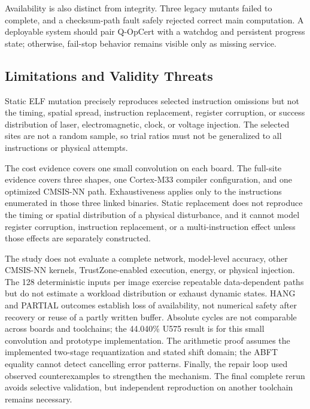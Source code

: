 \documentclass[conference]{IEEEtran}
\begin{document}
Availability is also distinct from integrity. Three legacy mutants failed to complete, and a checksum-path fault safely rejected correct main computation. A deployable system should pair Q-OpCert with a watchdog and persistent progress state; otherwise, fail-stop behavior remains visible only as missing service.

\subsection{Limitations and Validity Threats}
Static ELF mutation precisely reproduces selected instruction omissions but not the timing, spatial spread, instruction replacement, register corruption, or success distribution of laser, electromagnetic, clock, or voltage injection. The selected sites are not a random sample, so trial ratios must not be generalized to all instructions or physical attempts.

The cost evidence covers one small convolution on each board. The full-site evidence covers three shapes, one Cortex-M33 compiler configuration, and one optimized CMSIS-NN path. Exhaustiveness applies only to the instructions enumerated in those three linked binaries. Static replacement does not reproduce the timing or spatial distribution of a physical disturbance, and it cannot model register corruption, instruction replacement, or a multi-instruction effect unless those effects are separately constructed.

The study does not evaluate a complete network, model-level accuracy, other CMSIS-NN kernels, TrustZone-enabled execution, energy, or physical injection. The 128 deterministic inputs per image exercise repeatable data-dependent paths but do not estimate a workload distribution or exhaust dynamic states. HANG and PARTIAL outcomes establish loss of availability, not numerical safety after recovery or reuse of a partly written buffer. Absolute cycles are not comparable across boards and toolchains; the 44.040\% U575 result is for this small convolution and prototype implementation. The arithmetic proof assumes the implemented two-stage requantization and stated shift domain; the ABFT equality cannot detect cancelling error patterns. Finally, the repair loop used observed counterexamples to strengthen the mechanism. The final complete rerun avoids selective validation, but independent reproduction on another toolchain remains necessary.
\end{document}
